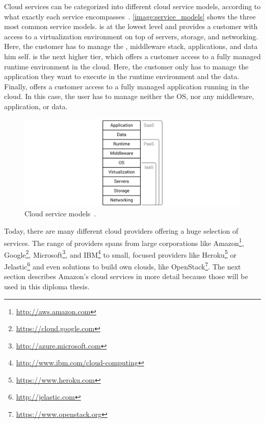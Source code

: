 Cloud services can be categorized into different cloud service models, according to what exactly each service encompasses~\autocite{cloudtaxonomy}.
\autoref{image:service_models} shows the three most common service models.
 is at the lowest level and provides a customer with access to a virtualization environment on top of servers, storage, and networking. Here, the customer has to manage the , middleware stack, applications, and data him self.
 is the next higher tier, which offers a customer access to a fully managed runtime environment in the cloud.
Here, the customer only has to manage the application they want to execute in the runtime environment and the data.
Finally,  offers a customer access to a fully managed application running in the cloud.
In this case, the user has to manage neither the OS, nor any middleware, application, or data.

\begin{figure}[!htbp]
	\centering
	\includegraphics[resolution=600]{fundamentals/assets/service_models}
	\caption{Cloud service models~\autocite[based on][]{cloud:def:gabler}.}
	\label{image:service_models}
\end{figure}

Today, there are many different cloud providers offering a huge selection of services.
The range of providers spans from large corporations like Amazon\footnote{\url{http://aws.amazon.com}\label{aws}}, Google\footnote{\url{https://cloud.google.com}}, Microsoft\footnote{\url{http://azure.microsoft.com}}, and IBM\footnote{\url{http://www.ibm.com/cloud-computing}} to small, focused providers like Heroku\footnote{\url{https://www.heroku.com}} or Jelastic\footnote{\url{http://jelastic.com}} and even solutions to build own clouds, like OpenStack\footnote{\url{https://www.openstack.org}}.
The next section describes Amazon's cloud services in more detail because those will be used in this diploma thesis.

